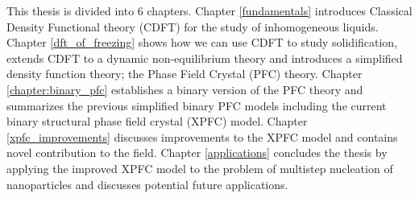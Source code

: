 \label{chapter:introduction}












This thesis is divided into 6 chapters. Chapter \ref{fundamentals} introduces
Classical Density Functional theory (CDFT) for the study of inhomogeneous
liquids. Chapter \ref{dft_of_freezing} shows how we can use CDFT to study
solidification, extends CDFT to a dynamic non-equilibrium theory and introduces
a simplified density function theory; the Phase Field Crystal (PFC) theory.
Chapter \ref{chapter:binary_pfc} establishes a binary version of the PFC theory and
summarizes the previous simplified binary PFC models including the current
binary structural phase field crystal (XPFC) model. Chapter
\ref{xpfc_improvements} discusses improvements to the XPFC model and contains
novel contribution to the field. Chapter \ref{applications} concludes the
thesis by applying the improved XPFC model to the problem of multistep
nucleation of nanoparticles and discusses potential future applications.
